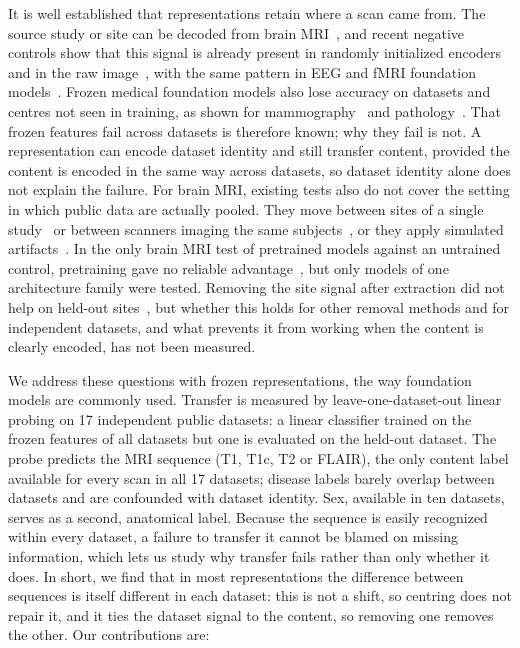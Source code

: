 \documentclass[11pt]{article}
\begin{document}
It is well established that representations retain where a scan came from.
The source study or site can be decoded from brain
MRI~\cite{wachinger_detect_2021, glocker_machine_2019}, and recent negative
controls show that this signal is already present in randomly initialized
encoders and in the raw image~\cite{rahbar_frozen_2026}, with the same pattern
in EEG and fMRI foundation models~\cite{zare_negative-control_2026,
tao_batch_2026}. Frozen medical foundation models also lose accuracy on
datasets and centres not seen in training, as shown for
mammography~\cite{germani_multi-institutional_2026, nguyen_benchmarking_2026}
and pathology~\cite{de_jong_current_2025, komen_towards_2025}. That frozen
features fail across datasets is therefore known; why they fail is not.
A representation can encode dataset identity and still transfer content,
provided the content is encoded in the same way across datasets, so dataset
identity alone does not explain the failure. For brain MRI, existing tests
also do not cover the setting in which public data are actually pooled. They
move between sites of a single study~\cite{rahbar_frozen_2026} or between
scanners imaging the same subjects~\cite{navarro-gonzalez_cross-scanner_2026},
or they apply simulated artifacts~\cite{mielcarz_3d_2026}. In the only brain
MRI test of pretrained models against an untrained control, pretraining gave
no reliable advantage~\cite{rahbar_frozen_2026}, but only models of one
architecture family were tested. Removing the site signal after extraction
did not help on held-out sites~\cite{rahbar_frozen_2026}, but whether this
holds for other removal methods and for independent datasets, and what
prevents it from working when the content is clearly encoded, has not been
measured.

We address these questions with frozen representations, the way foundation
models are commonly used. Transfer is measured by leave-one-dataset-out
linear probing on 17 independent public datasets: a linear classifier trained
on the frozen features of all datasets but one is evaluated on the held-out
dataset. The probe predicts the MRI sequence (T1, T1c, T2 or FLAIR), the only
content label available for every scan in all 17 datasets; disease labels
barely overlap between datasets and are confounded with dataset identity. Sex,
available in ten datasets, serves as a second, anatomical label. Because the sequence is easily
recognized within every dataset, a failure to transfer it cannot be blamed
on missing information, which lets us study why transfer fails rather than
only whether it does. In short, we find that in most representations the
difference between sequences is itself different in each dataset: this is
not a shift, so centring does not repair it, and it ties the dataset signal
to the content, so removing one removes the other. Our contributions are:
\end{document}
